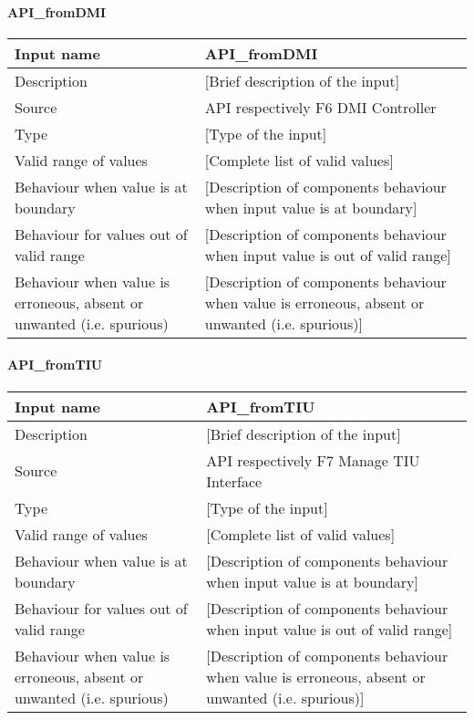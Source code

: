 \paragraph{API\_fromDMI}

\begin{longtable}{p{}p{}}
\toprule
Input name				& API\_fromDMI \\
\midrule
Description				& [Brief description of the input] \\
\midrule
Source					& API respectively F6 DMI Controller\\ 
\midrule
Type					& [Type of the input] \\
\midrule
Valid range of values	& [Complete list of valid values] \\
\midrule
Behaviour when value is at boundary	& [Description of components behaviour when input value is at boundary] \\
\midrule
Behaviour for values out of valid range	& [Description of components behaviour when input value is out of valid range] \\
\midrule
Behaviour when value is erroneous, absent or unwanted (i.e. spurious) & [Description of components behaviour when value is erroneous, absent or unwanted (i.e. spurious)] \\
\bottomrule
\end{longtable}

\paragraph{API\_fromTIU}

\begin{longtable}{p{}p{}}
\toprule
Input name				& API\_fromTIU \\
\midrule
Description				& [Brief description of the input] \\
\midrule
Source					& API respectively F7 Manage TIU Interface \\ 
\midrule
Type					& [Type of the input] \\
\midrule
Valid range of values	& [Complete list of valid values] \\
\midrule
Behaviour when value is at boundary	& [Description of components behaviour when input value is at boundary] \\
\midrule
Behaviour for values out of valid range	& [Description of components behaviour when input value is out of valid range] \\
\midrule
Behaviour when value is erroneous, absent or unwanted (i.e. spurious) & [Description of components behaviour when value is erroneous, absent or unwanted (i.e. spurious)] \\
\bottomrule
\end{longtable}

